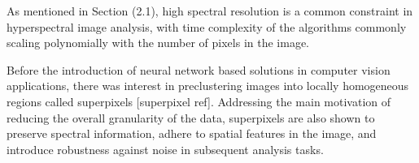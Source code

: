 As mentioned in Section (2.1), high spectral resolution is a common constraint in hyperspectral image analysis, with time complexity of the algorithms commonly scaling polynomially with the number of pixels in the image. 

Before the introduction of neural network based solutions in computer vision applications, there was interest in preclustering images into locally homogeneous regions called superpixels [superpixel ref]. Addressing the main motivation of reducing the overall granularity of the data, superpixels are also shown to preserve spectral information, adhere to spatial features in the image, and introduce robustness against noise in subsequent analysis tasks.

